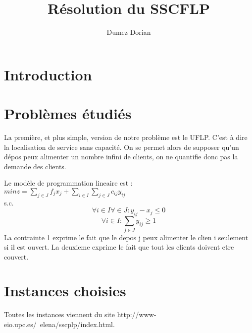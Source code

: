 \documentclass[a4paper]{llncs}
\begin{document}
\mainmatter 

\title{Résolution du SSCFLP}

\author{Dumez Dorian}


\tocauthor{{}}

\maketitle

\medskip

\begingroup
\let\clearpage\relax
\tableofcontents
{}
\endgroup

\medskip
\medskip

\section*{Introduction}

\section{Problèmes étudiés}

La première, et plus simple, version de notre problème est le UFLP. C'est à dire la localisation de service sans capacité. On se permet alors de supposer qu'un dépos peux alimenter un nombre infini de clients, on ne quantifie donc pas la demande des clients.

Le modèle de programmation lineaire est : \\
$min z = \sum \limits_{j \in J} f_j x_j + \sum \limits_{i \in I} \sum \limits_{j \in J} c_{ij} y_{ij}$\\
s.c.
\begin{equation}
 \forall i \in I \forall  \in J : y_{ij} - x_j \leqslant 0
\end{equation}
\begin{equation}
 \forall i \in I : \sum \limits_{j \in J} y_{ij} \geqslant 1
\end{equation}
La contrainte 1 exprime le fait que le depos j peux alimenter le clien i seulement si il est ouvert. La deuxieme exprime le fait que tout les clients doivent etre couvert.

\section{Instances choisies}

Toutes les instances viennent du site http://www-eio.upc.es/~elena/sscplp/index.html.\\
\end{document}
